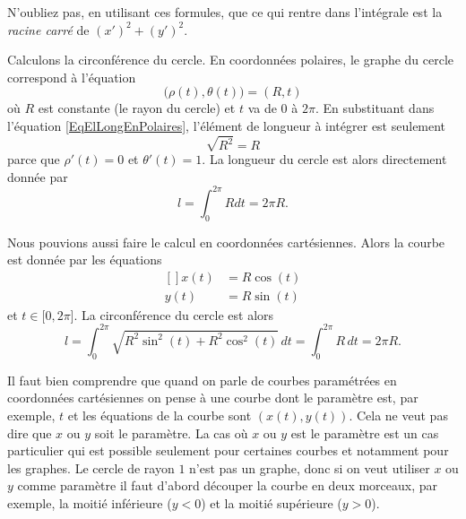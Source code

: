 \begin{remark}
    N'oubliez pas, en utilisant ces formules, que ce qui rentre dans l'intégrale est la \emph{racine carré} de $(x')^2+(y')^2$.
\end{remark}

\begin{example}     \label{ExempleLongCercle}
    Calculons la circonférence du cercle. En coordonnées polaires, le graphe du cercle correspond à l'équation
    \begin{equation}
        \big( \rho(t),\theta(t) \big)=(R,t)
    \end{equation}
    où $R$ est constante (le rayon du cercle) et $t$ va de $0$ à $2\pi$. En substituant dans l'équation \eqref{EqElLongEnPolaires}, l'élément de longueur à intégrer est seulement
    \begin{equation}
        \sqrt{R^2}=R
    \end{equation}
    parce que $\rho'(t)=0$ et $\theta'(t)=1$. La longueur du cercle est alors directement donnée par
    \begin{equation}
        l=\int_0^{2\pi}Rdt=2\pi R.
    \end{equation}
    
    Nous pouvions aussi faire le calcul en coordonnées cartésiennes. Alors la courbe est donnée par les équations
    \begin{equation}
        \begin{aligned}[]
            x(t)&=R\cos(t)\\
            y(t)&=R\sin(t)
        \end{aligned}
    \end{equation}
    et $t\in\mathopen[ 0 , 2\pi \mathclose]$. La circonférence du cercle est alors 
    \begin{equation}
        l=\int_0^{2\pi}\sqrt{R^2\sin^2(t)+R^2\cos^2(t)}\,dt=\int_0^{2\pi}R\,dt=2\pi R.
    \end{equation}
\end{example}
\begin{remark}
  Il faut bien comprendre que quand on parle de courbes paramétrées en  coordonnées cartésiennes on pense à une courbe dont le paramètre est, par exemple, $t$ et les équations de la courbe sont $(x(t), y(t))$. Cela ne veut pas dire que $x$ ou $y$ soit le paramètre. La cas où $x$ ou $y$ est le paramètre est un cas particulier qui est possible seulement pour certaines courbes et notamment pour les graphes. Le cercle de rayon $1$ n'est pas un graphe, donc si on veut utiliser $x$ ou $y$ comme paramètre il faut d'abord découper la courbe en deux morceaux, par exemple, la moitié inférieure ($y<0$) et la moitié supérieure ($y>0$).  
\end{remark}
